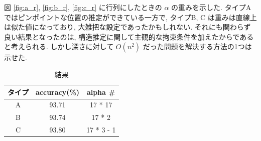 \documentclass[twocolumn]{jarticle}     %
\begin{document}
図 \ref{fig:a_r}, \ref{fig:b_r}, \ref{fig:c_r} に行列にしたときの
 $\alpha$ の重みを示した.
タイプA ではピンポイントな位置の推定ができている一方で,
タイプB, C は重みは直線上は似た値になっており, 大雑把な設定であったかもしれない.
それにも関わらず良い結果となったのは, 構造推定に関して主観的な拘束条件を加えたからであると考えられる.
しかし深さに対して $O(n^2)$ だった問題を解決する方法の1つは示せた.

\begin{table}[tb]
  \begin{center}
    \caption{結果}
    \begin{tabular}{|c|c|c|} \hline
      タイプ & accuracy(\%) & alpha \# \\ \hline\hline
      A & 93.71 & 17 * 17 \\ \hline
      B & 93.74 & 17 * 2 \\ \hline
      C & 93.80 & 17 * 3 - 1 \\ \hline
    \end{tabular}
    \label{tab:result}
  \end{center}
\end{table}
\end{document}
